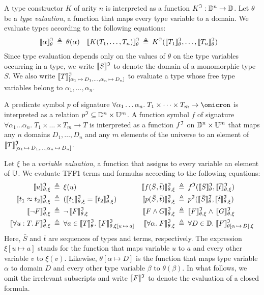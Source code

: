 A type constructor $K$ of arity $n$ is interpreted as a function
$K^{\mathfrak{I}} : \mathbb{D}^n \to \mathbb{D}$.
Let $\theta$ be a {\em type valuation}, a function that maps every
type variable to a domain. We evaluate types according
to the following equations:
\begin{align*}
\llbracket\alpha\rrbracket^{\mathfrak{I}}_{\theta} &\:\triangleq\: \theta(\alpha) &
\llbracket K(T_1,\dots,T_n)\rrbracket^{\mathfrak{I}}_{\theta} &\:\triangleq\: K^{\mathfrak{I}}(\llbracket T_1\rrbracket^{\mathfrak{I}}_{\theta},\dots,\llbracket T_n\rrbracket^{\mathfrak{I}}_{\theta})
\end{align*}
Since type evaluation depends only on the values of $\theta$
on the type variables occurring in a type, we write $\llbracket S\rrbracket^{\mathfrak{I}}$
to denote the domain of a monomorphic type $S$. We also write
$\llbracket T\rrbracket^{\mathfrak{I}}_{[\alpha_1\,\mapsto\,D_1,\dots,\alpha_n\,\mapsto\,D_n]}$
to evaluate a type whose free type variables
belong to $\alpha_1,\dots,\alpha_n$.

A predicate symbol $p$ of signature
$\forall \alpha_1\dots\alpha_n .\; T_1 \times \dots \times T_m
\to \omicron$ is interpreted as a relation
$p^{\mathfrak{I}} \subseteq \mathbb{D}^n \times \mathbb{U}^m$.
A function symbol $f$ of signature
$\forall \alpha_1\dots\alpha_n .\; T_1 \times \dots \times T_m \to T$
is interpreted as a function
$f^{\mathfrak{I}}$ on $\mathbb{D}^n \times \mathbb{U}^m$ that
maps any $n$ domains $D_1,\dots,D_n$ and
any $m$ elements of the universe
to an element of
$\llbracket T\rrbracket^{\mathfrak{I}}_{[\alpha_1\,\mapsto\,D_1,\dots,\alpha_n\,\mapsto\,D_n]}$.

Let $\xi$ be a {\em variable valuation}, a function that assigns
to every variable an element of $\mathbb{U}$. We evaluate TFF1 terms
and formulas according to the following equations:
\begin{align*}
\eval{u} &\eqdef \xi(u) &
\eval{f(\bar{S},\bar{t})} &\eqdef f^\cI(\evalT{\bar{S}},\eval{\bar{t}}) \\
\eval{t_1 \eq t_2} &\eqdef (\eval{t_1} = \eval{t_2}) &
\eval{p(\bar{S},\bar{t})} &\eqdef p^\cI(\evalT{\bar{S}},\eval{\bar{t}}) \\
\eval{\lnot F} &\eqdef \lnot\, \eval{F} &
\eval{F \land G} &\eqdef \eval{F} \land\, \eval{G} \\
\eval{\forall u \ty T .\, F} &\eqdef \forall {a \in \evalT{T}} .\;
\evalG{F}_{\theta,\xi[u\,\mapsto\,a]} &
\eval{\forall \alpha .\; F} &\eqdef \forall {D \in \sorts} .\;
\evalG{F}_{\theta[\alpha\,\mapsto\,D],\xi} %
\end{align*}
Here, $\bar{S}$ and $\bar{t}$ are sequences of types and terms, respectively.
The expression $\xi[u \mapsto a]$ stands for the function that
maps variable $u$ to $a$ and every other variable $v$ to $\xi(v)$.
Likewise, $\theta[\alpha \mapsto D]$ is the function that maps
type variable $\alpha$ to domain $D$ and every other type
variable $\beta$ to $\theta(\beta)$. In what follows,
we omit the irrelevant subscripts and write $\llbracket F\rrbracket^{\mathfrak{I}}$
to denote the evaluation of a closed formula.

